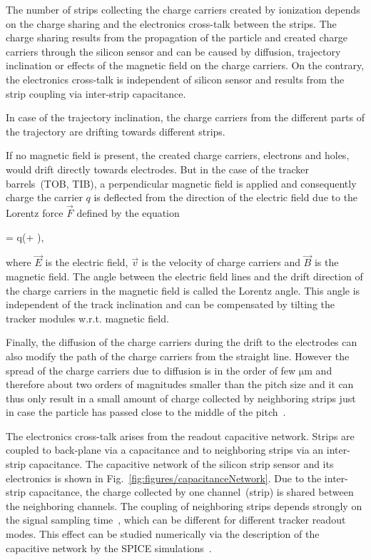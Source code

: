 The number of strips collecting the charge carriers created by ionization depends on the charge sharing and the electronics cross-talk between the strips. The charge sharing results from the propagation of the particle and created charge carriers through the silicon sensor and can be caused by diffusion, trajectory inclination or effects of the magnetic field on the charge carriers. On the contrary, the electronics cross-talk is independent of silicon sensor and results from the strip coupling via inter-strip capacitance.  

In case of the trajectory inclination, the charge carriers from the different parts of the trajectory are drifting towards different strips. 

If no magnetic field is present, the created charge carriers, electrons and holes, would drift directly towards electrodes. But in the case of the tracker barrels~(TOB, TIB), a perpendicular magnetic field is applied  and consequently charge the carrier $q$ is deflected from the direction of the electric field due to the Lorentz force $\vec{F}$ defined by the equation

{
   =  q(+ \times {}),
}

where $\vec{E}$ is the electric field, $\vec{v}$ is the velocity of charge carriers and $\vec{B}$ is the magnetic field. The angle between the electric field lines and the drift direction of the charge carriers in the magnetic field is called the Lorentz angle. This angle is independent of the track inclination and can be compensated by tilting the tracker modules w.r.t. magnetic field.

Finally, the diffusion of the charge carriers during the drift to the electrodes can also modify the path of the charge carriers from the straight line. However the spread of the charge carriers due to diffusion is in  the order of few $\mathrm{\mu m}$ and therefore about two orders of magnitudes smaller than the pitch size and it can thus only result in a small amount of charge collected by neighboring strips just in case the particle has passed close to the middle of the pitch~\cite{Bloch:2007zza}.


The electronics cross-talk arises from the readout capacitive network. Strips are coupled to back-plane via a capacitance and to neighboring strips via an inter-strip capacitance. The capacitive network of the silicon strip sensor and its electronics is shown in Fig.~\ref{fig:figures/capacitanceNetwork}. Due to the inter-strip capacitance, the charge collected by one channel~(strip) is shared between the neighboring channels. The coupling of neighboring strips depends strongly on the signal sampling time~\cite{Bloch:2007zza}, which can be different for different tracker readout modes. This effect can be studied numerically via the description of the capacitive network by the SPICE simulations~\cite{Barberis:1993ph}.


